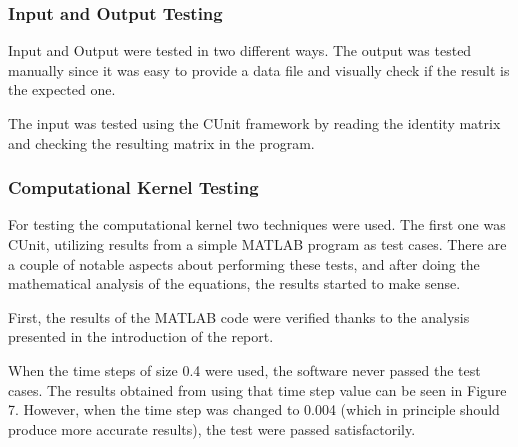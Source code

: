 \documentclass[12pt,a4paper]{article}
\begin{document}



\subsubsection{Input and Output Testing}

Input and Output were tested in two different ways. The output was tested manually since it was easy to provide a data file and visually check if the result is the expected one. 

The input was tested using the CUnit framework by reading the identity matrix and checking the resulting matrix in the program. 



\subsubsection{Computational Kernel Testing}


For testing the computational kernel two techniques were used. The first one was CUnit, utilizing results from a simple MATLAB program as test cases. There are a couple of notable aspects about performing these tests, and after doing the mathematical analysis of the equations, the results started to make sense. 

First, the results of the MATLAB code were verified thanks to the analysis presented in the introduction of the report.

When the time steps of size 0.4 were used, the software never passed the test cases. The results obtained from using that time step value can be seen in Figure 7. However, when the time step was changed to 0.004 (which in principle should produce more accurate results), the test were passed satisfactorily. 
\end{document}
